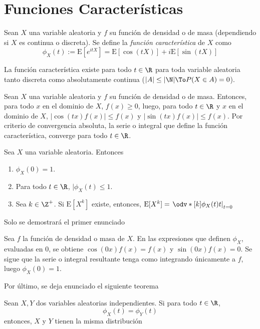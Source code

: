 \section{Funciones Características}
\begin{Def}
  Sean $X$ una variable aleatoria y $f$ su función de densidad o de masa
  (dependiendo si $X$ es continua o discreta). Se define la
  \emph{función característica} de $X$ como
  \[\phi_X(t) := \text{E}[e^{itX}] = \text{E}[\cos(tX)] + i\text{E}[\sin(tX)]\]
\end{Def}

\begin{Teo}
  La función característica existe para todo $t\in\R$ para
  toda variable aleatoria
  tanto discreta como absolutamente continua ($|A|\leq|\N|\To P(X\in A)=0$).
\end{Teo}
\begin{Demo}
  Sean $X$ una variable aleatoria y $f$ su función de densidad o de masa.
  Entonces, para todo $x$ en el dominio de $X$, $f(x)\geq0$,  luego,
  para todo $t\in\R$ y $x$ en el dominio de $X$,
  $|\cos(tx)f(x)|\leq f(x)$ y $|\sin(tx)f(x)|\leq f(x)$.
  Por criterio de convergencia absoluta, la serie o integral que
  define la función característica, converge para todo $t\in\R$.
\end{Demo}

\begin{Teo}\label{Teo:prop_carac}
  Sea $X$ una variable aleatoria. Entonces
  \begin{enumerate}
    \item $\phi_X(0)=1$.
    \item Para todo $t\in\R$, $|\phi_X(t)\leq 1$.
    \item Sea $k\in\Z^+$. Si $\text{E}[X^k]$ existe, entonces,
    $\text{E}[X^k]=\left.\odv*[k]{\phi_X(t)}{t}\right|_{t=0}$
  \end{enumerate}
\end{Teo}
Solo se demostrará el primer enunciado
\begin{Demo}
  Sea $f$ la función de densidad o masa de $X$. En las expresiones que
  definen $\phi_X$, evaluadas en $0$, se obtiene
  $\cos(0x)f(x)=f(x)$ y $\sin(0x)f(x)=0$.
  Se sigue que la serie o integral resultante tenga como
  integrando únicamente a $f$, luego $\phi_X(0)=1$.
\end{Demo}
Por último, se deja enunciado el siguiente teorema
\begin{Teo}\label{Teo:biy_carac}
  Sean $X,Y$ dos variables aleatorias independientes. Si
  para todo $t\in\R$,
  \[\phi_X(t)=\phi_Y(t)\]
  entonces, $X$ y $Y$ tienen la misma distribución
\end{Teo}